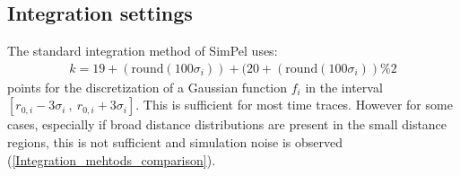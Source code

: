 \documentclass[pdftex,bezier,german,a4,twoside, headexclude,12pt,nochapterprefix, titlepage]{extarticle}
\newcommand{\simpel}{\textsf{SimPel} }
\newcommand{\figspace}{\hspace{0.5cm}}
\begin{document}
\subsection{Integration settings}
The standard  integration method of \simpel uses:
\begin{align*}
k =  19+(\mathrm{round}(100\sigma_i)) + (20+(\mathrm{round}(100\sigma_i))\%2
\end{align*}
points for the discretization of a Gaussian function $f_i$ in the interval
$[r_{0,i}-3\sigma_i \ ,\ r_{0,i}+3\sigma_i]$. This is sufficient for most time traces. However for some cases, especially
if broad distance distributions are present in the small distance regions, this is not sufficient and simulation noise is observed
(\autoref{Integration_mehtods_comparison}).
\begin{figure}[!htb]
\centering
     \figspace
      \\[-0.3cm]

\end{figure}
\end{document}
